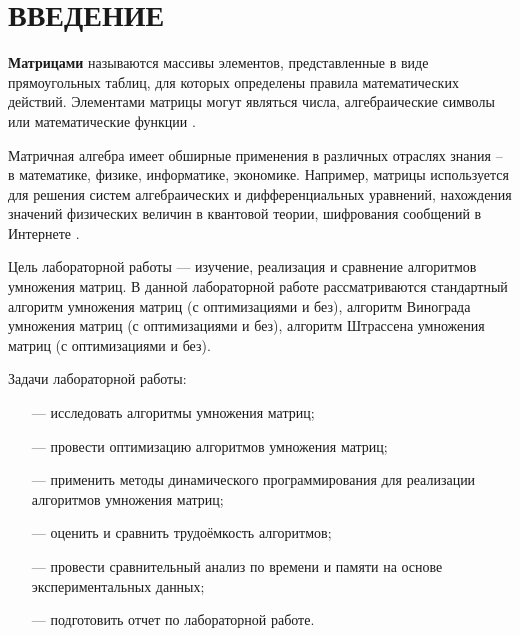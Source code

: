 \chapter*{ВВЕДЕНИЕ}

\textbf{Матрицами} называются массивы элементов, представленные в виде прямоугольных таблиц, для которых определены правила математических действий. Элементами матрицы могут являться числа, алгебраические символы или математические функции \cite{Matrix}.

Матричная алгебра имеет обширные применения в различных отраслях знания – в математике, физике, информатике, экономике. Например, матрицы используется для решения систем алгебраических и дифференциальных уравнений, нахождения значений физических величин в квантовой теории, шифрования сообщений в Интернете \cite{Matrix}.

Цель лабораторной работы ---  изучение, реализация и сравнение алгоритмов
умножения матриц. В данной лабораторной работе рассматриваются стандартный алгоритм умножения матриц (с оптимизациями и без), алгоритм Винограда умножения матриц (с оптимизациями и без), алгоритм Штрассена умножения матриц (с оптимизациями и без).

Задачи лабораторной работы:

\begin{itemize}
	\item[---] исследовать алгоритмы умножения матриц;
	\item[---] провести оптимизацию алгоритмов умножения матриц;
	\item[---] применить методы динамического программирования для реализации алгоритмов умножения матриц;
	\item[---] оценить и сравнить трудоёмкость алгоритмов;
	\item[---] провести сравнительный анализ по времени и памяти на основе экспериментальных данных;
	\item[---] подготовить отчет по лабораторной работе.
\end{itemize}

\pagebreak
